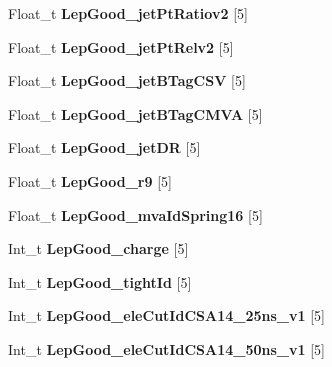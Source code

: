 \begin{DoxyCompactItemize}
Float\+\_\+t {\bfseries Lep\+Good\+\_\+jet\+Pt\+Ratiov2} \mbox{[}5\mbox{]}
\item 
\hypertarget{classMiniTree_aeae377c153d23e71ae9721057061ecf1}{}\label{classMiniTree_aeae377c153d23e71ae9721057061ecf1} 
Float\+\_\+t {\bfseries Lep\+Good\+\_\+jet\+Pt\+Relv2} \mbox{[}5\mbox{]}
\item 
\hypertarget{classMiniTree_a4ba4b282092c97edd6b49c59986fce9d}{}\label{classMiniTree_a4ba4b282092c97edd6b49c59986fce9d} 
Float\+\_\+t {\bfseries Lep\+Good\+\_\+jet\+B\+Tag\+C\+SV} \mbox{[}5\mbox{]}
\item 
\hypertarget{classMiniTree_a6b9d3178ceabaee680f594a02bcb0908}{}\label{classMiniTree_a6b9d3178ceabaee680f594a02bcb0908} 
Float\+\_\+t {\bfseries Lep\+Good\+\_\+jet\+B\+Tag\+C\+M\+VA} \mbox{[}5\mbox{]}
\item 
\hypertarget{classMiniTree_a5a3c1679450abd2b089c8245597a599d}{}\label{classMiniTree_a5a3c1679450abd2b089c8245597a599d} 
Float\+\_\+t {\bfseries Lep\+Good\+\_\+jet\+DR} \mbox{[}5\mbox{]}
\item 
\hypertarget{classMiniTree_a8488ddae2f852b81d89a95837310996c}{}\label{classMiniTree_a8488ddae2f852b81d89a95837310996c} 
Float\+\_\+t {\bfseries Lep\+Good\+\_\+r9} \mbox{[}5\mbox{]}
\item 
\hypertarget{classMiniTree_a11512b2e0f84cb7731bb101920ae0337}{}\label{classMiniTree_a11512b2e0f84cb7731bb101920ae0337} 
Float\+\_\+t {\bfseries Lep\+Good\+\_\+mva\+Id\+Spring16} \mbox{[}5\mbox{]}
\item 
\hypertarget{classMiniTree_a27f96c59248786bf2df6f26ea16c807a}{}\label{classMiniTree_a27f96c59248786bf2df6f26ea16c807a} 
Int\+\_\+t {\bfseries Lep\+Good\+\_\+charge} \mbox{[}5\mbox{]}
\item 
\hypertarget{classMiniTree_acda1cfee20ffd37f15a1a206b5a774cc}{}\label{classMiniTree_acda1cfee20ffd37f15a1a206b5a774cc} 
Int\+\_\+t {\bfseries Lep\+Good\+\_\+tight\+Id} \mbox{[}5\mbox{]}
\item 
\hypertarget{classMiniTree_a46b255cb3678ce54ae8dfae29c08f08c}{}\label{classMiniTree_a46b255cb3678ce54ae8dfae29c08f08c} 
Int\+\_\+t {\bfseries Lep\+Good\+\_\+ele\+Cut\+Id\+C\+S\+A14\+\_\+25ns\+\_\+v1} \mbox{[}5\mbox{]}
\item 
\hypertarget{classMiniTree_a40844cad6e38a22200fa092606eab468}{}\label{classMiniTree_a40844cad6e38a22200fa092606eab468} 
Int\+\_\+t {\bfseries Lep\+Good\+\_\+ele\+Cut\+Id\+C\+S\+A14\+\_\+50ns\+\_\+v1} \mbox{[}5\mbox{]}
\item 
\hypertarget{classMiniTree_a91cd6e1c7eb5cfcfc90648ebfe0d1150}{}\label{classMiniTree_a91cd6e1c7eb5cfcfc90648ebfe0d1150} 

\end{DoxyCompactItemize}
